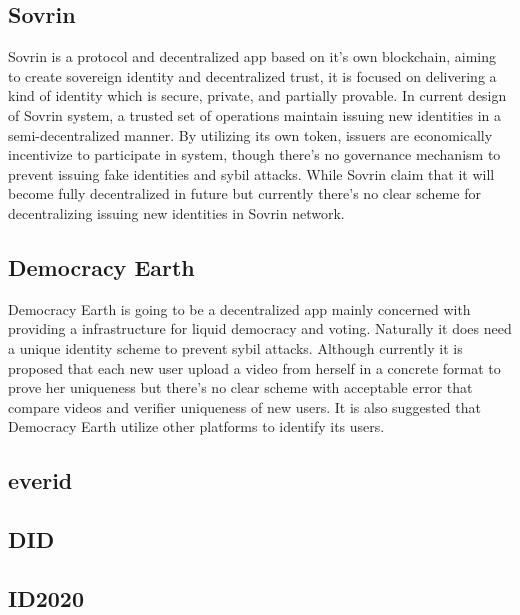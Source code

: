 \documentclass{article}
\begin{document}
\subsection{Sovrin}

Sovrin is a protocol and decentralized app based on it’s own blockchain, aiming to create sovereign identity and decentralized trust, it is focused on delivering a kind of identity which is secure, private, and partially provable. In current design of Sovrin system, a trusted set of operations maintain issuing new identities in a semi-decentralized manner. By utilizing its own token, issuers are economically incentivize to participate in system, though there’s no governance mechanism to prevent issuing fake identities and sybil attacks. While Sovrin claim that it will become fully decentralized in future but currently there’s no clear scheme for decentralizing issuing new identities in Sovrin network. 

\subsection{Democracy Earth}
Democracy Earth is going to be a decentralized app mainly concerned with providing a infrastructure for liquid democracy and voting. Naturally it does need a unique identity scheme to prevent sybil attacks. Although currently it is proposed that each new user upload a video from herself in a concrete format to prove her uniqueness but there’s no clear scheme with acceptable error that compare videos and verifier uniqueness of new users. It is also suggested that Democracy Earth utilize other platforms to identify its users.
\subsection{everid}
\subsection{ DID}
\subsection{ID2020}
\end{document}
